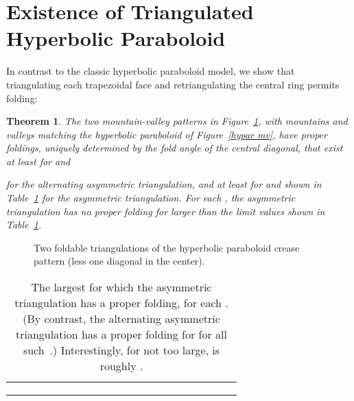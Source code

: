 \documentclass[11pt,letterpaper]{article}
\newtheorem{theorem}{Theorem}
\begin{document}
\section{Existence of Triangulated Hyperbolic Paraboloid}

In contrast to the classic hyperbolic paraboloid model,
we show that triangulating each trapezoidal face
and retriangulating the central ring permits folding:

\begin{theorem}
  The two mountain-valley patterns in Figure~\ref{hypar triangulations},
  with mountains and valleys matching the hyperbolic paraboloid
  of Figure~\ref{hypar mv}, have proper foldings,
  uniquely determined by the fold angle  of the central diagonal,
  that exist at least for  and
  
  for the alternating asymmetric triangulation,
  and at least for  and  shown in Table~\ref{n vs theta}
  for the asymmetric triangulation.
  For each ,
  the asymmetric triangulation has no proper folding for  larger
  than the limit values shown in Table~\ref{n vs theta}.
\end{theorem}

\begin{figure}
  \centering
  \hfil
  \caption{Two foldable triangulations of the hyperbolic paraboloid
           crease pattern (less one diagonal in the center).}
  \label{hypar triangulations}
\end{figure}

\begin{table}
  \centering
  \begin{tabular}{c|cccccccccccccccccccc}
     &  &  &  &  &  &  &  &  &  &  &  &  &  &  &  & 
    \\ \hline
     &  &  &  &  &  &  &  &  &  &  &  &  &  &  &  & 
    \bigskip \\
     &  &  &  &  &  &  &  &  &  &  &  &  &  &  &  & 
    \\ \hline
     &  &  &  &  &  &  &  &  &  &  &  &  &  &  &  & 
  \end{tabular}
  \caption{The largest  for which the asymmetric triangulation has a proper
    folding, for each .
    (By contrast, the alternating asymmetric triangulation
     has a proper folding for  for all such~.)
    Interestingly, for  not too large,
     is roughly .}
  \label{n vs theta}
\end{table}
\end{document}
